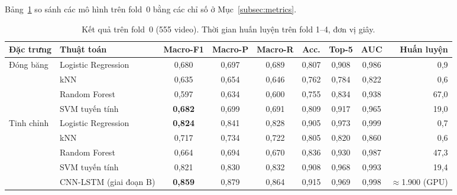 Bảng~\ref{tab:res_fold0} so sánh các mô hình trên fold~0 bằng các chỉ số ở Mục~\ref{subsec:metrics}.

\begin{table}[H]
  \centering
  \caption{Kết quả trên fold~0 (555 video). Thời gian huấn luyện trên fold 1--4, đơn vị giây.}
  \label{tab:res_fold0}
  \small
  \setlength{\tabcolsep}{4pt}
  \begin{adjustbox}{max width=\textwidth}
  \begin{tabular}{@{}llccccccr@{}}
    \toprule
    \textbf{Đặc trưng} & \textbf{Thuật toán} & \textbf{Macro-F1} & \textbf{Macro-P} & \textbf{Macro-R} & \textbf{Acc.} & \textbf{Top-5} & \textbf{AUC} & \textbf{Huấn luyện} \\
    \midrule
    \multirow{4}{*}{Đóng băng} & Logistic Regression & 0,680 & 0,697 & 0,689 & 0,807 & 0,908 & 0,986 & 0,9 \\
     & kNN & 0,635 & 0,654 & 0,646 & 0,762 & 0,784 & 0,822 & 0,6 \\
     & Random Forest & 0,597 & 0,634 & 0,600 & 0,755 & 0,834 & 0,938 & 67,0 \\
     & SVM tuyến tính & \textbf{0,682} & 0,699 & 0,691 & 0,809 & 0,917 & 0,965 & 19,0 \\
    \midrule
    \multirow{5}{*}{Tinh chỉnh} & Logistic Regression & \textbf{0,824} & 0,841 & 0,828 & 0,905 & 0,973 & 0,999 & 0,7 \\
     & kNN & 0,717 & 0,734 & 0,722 & 0,805 & 0,820 & 0,860 & 0,6 \\
     & Random Forest & 0,664 & 0,694 & 0,670 & 0,836 & 0,930 & 0,987 & 47,3 \\
     & SVM tuyến tính & 0,821 & 0,830 & 0,832 & 0,908 & 0,968 & 0,993 & 19,4 \\
     & CNN-LSTM (giai đoạn B) & \textbf{0,859} & 0,879 & 0,864 & 0,915 & 0,969 & 0,998 & $\approx$1.900 (GPU) \\
    \bottomrule
  \end{tabular}
  \end{adjustbox}
\end{table}


